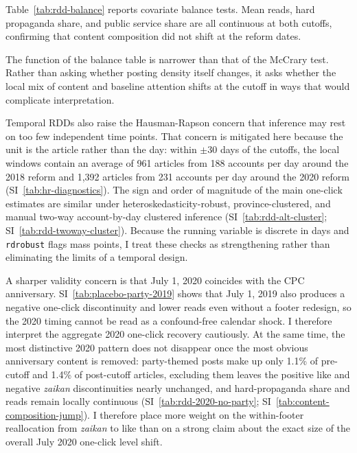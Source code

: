 \documentclass[12pt, american]{article}
\begin{document}
\begin{refsection}
Table~\ref{tab:rdd-balance} reports covariate balance tests. Mean reads, hard propaganda share, and public service share are all continuous at both cutoffs, confirming that content composition did not shift at the reform dates.

The function of the balance table is narrower than that of the McCrary test. Rather than asking whether posting density itself changes, it asks whether the local mix of content and baseline attention shifts at the cutoff in ways that would complicate interpretation.



Temporal RDDs also raise the Hausman-Rapson concern that inference may rest on too few independent time points. That concern is mitigated here because the unit is the article rather than the day: within $\pm 30$ days of the cutoffs, the local windows contain an average of 961 articles from 188 accounts per day around the 2018 reform and 1,392 articles from 231 accounts per day around the 2020 reform (SI~\ref{tab:hr-diagnostics}). The sign and order of magnitude of the main one-click estimates are similar under heteroskedasticity-robust, province-clustered, and manual two-way account-by-day clustered inference (SI~\ref{tab:rdd-alt-cluster}; SI~\ref{tab:rdd-twoway-cluster}). Because the running variable is discrete in days and \texttt{rdrobust} flags mass points, I treat these checks as strengthening rather than eliminating the limits of a temporal design.

A sharper validity concern is that July 1, 2020 coincides with the CPC anniversary. SI~\ref{tab:placebo-party-2019} shows that July 1, 2019 also produces a negative one-click discontinuity and lower reads even without a footer redesign, so the 2020 timing cannot be read as a confound-free calendar shock. I therefore interpret the aggregate 2020 one-click recovery cautiously. At the same time, the most distinctive 2020 pattern does not disappear once the most obvious anniversary content is removed: party-themed posts make up only 1.1\% of pre-cutoff and 1.4\% of post-cutoff articles, excluding them leaves the positive like and negative \textit{zaikan} discontinuities nearly unchanged, and hard-propaganda share and reads remain locally continuous (SI~\ref{tab:rdd-2020-no-party}; SI~\ref{tab:content-composition-jump}). I therefore place more weight on the within-footer reallocation from \textit{zaikan} to like than on a strong claim about the exact size of the overall July 2020 one-click level shift.


\end{refsection}
\end{document}
